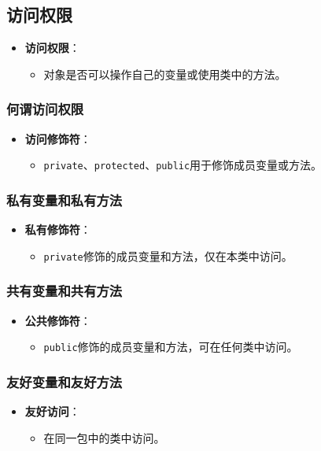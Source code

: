 \documentclass[a4paper, 10pt]{ctexart}
\begin{document}
\subsection{访问权限}
\begin{itemize}
  \item \textbf{访问权限}：
  \begin{itemize}
    \item 对象是否可以操作自己的变量或使用类中的方法。
  \end{itemize}
\end{itemize}

\subsubsection{何谓访问权限}
\begin{itemize}
  \item \textbf{访问修饰符}：
  \begin{itemize}
    \item \texttt{private}、\texttt{protected}、\texttt{public}用于修饰成员变量或方法。
  \end{itemize}
\end{itemize}

\subsubsection{私有变量和私有方法}
\begin{itemize}
  \item \textbf{私有修饰符}：
  \begin{itemize}
    \item \texttt{private}修饰的成员变量和方法，仅在本类中访问。
  \end{itemize}
\end{itemize}

\subsubsection{共有变量和共有方法}
\begin{itemize}
  \item \textbf{公共修饰符}：
  \begin{itemize}
    \item \texttt{public}修饰的成员变量和方法，可在任何类中访问。
  \end{itemize}
\end{itemize}

\subsubsection{友好变量和友好方法}
\begin{itemize}
  \item \textbf{友好访问}：
  \begin{itemize}
    \item 在同一包中的类中访问。
  \end{itemize}
\end{itemize}
\end{document}
